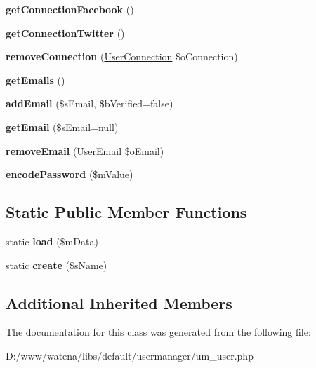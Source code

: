 \begin{DoxyCompactItemize}
\item 
\hypertarget{class_user_a69af1e21e331f954f22c511e8bf58b96}{{\bfseries get\-Connection\-Facebook} ()}\label{class_user_a69af1e21e331f954f22c511e8bf58b96}

\item 
\hypertarget{class_user_a19b24a9d7dccaf05646cb0f79a9ee52c}{{\bfseries get\-Connection\-Twitter} ()}\label{class_user_a19b24a9d7dccaf05646cb0f79a9ee52c}

\item 
\hypertarget{class_user_aa71e3aca612e5a6718f7ced1a44aa04c}{{\bfseries remove\-Connection} (\hyperlink{class_user_connection}{User\-Connection} \$o\-Connection)}\label{class_user_aa71e3aca612e5a6718f7ced1a44aa04c}

\item 
\hypertarget{class_user_a3c086413260d34ff4b247aa43312f87f}{{\bfseries get\-Emails} ()}\label{class_user_a3c086413260d34ff4b247aa43312f87f}

\item 
\hypertarget{class_user_a9e5819ec9b86a72ef09df68bf44aa5da}{{\bfseries add\-Email} (\$s\-Email, \$b\-Verified=false)}\label{class_user_a9e5819ec9b86a72ef09df68bf44aa5da}

\item 
\hypertarget{class_user_a906c866d515ade7d2872084192acabeb}{{\bfseries get\-Email} (\$s\-Email=null)}\label{class_user_a906c866d515ade7d2872084192acabeb}

\item 
\hypertarget{class_user_ae173c13825d8a41ec073485bce7316ed}{{\bfseries remove\-Email} (\hyperlink{class_user_email}{User\-Email} \$o\-Email)}\label{class_user_ae173c13825d8a41ec073485bce7316ed}

\item 
\hypertarget{class_user_a65978063da01806f89e29ed3ea8702bc}{{\bfseries encode\-Password} (\$m\-Value)}\label{class_user_a65978063da01806f89e29ed3ea8702bc}

\end{DoxyCompactItemize}
\subsection*{Static Public Member Functions}
\begin{DoxyCompactItemize}
\item 
\hypertarget{class_user_a03d0f98a0b877caccba9fe5a3535d06e}{static {\bfseries load} (\$m\-Data)}\label{class_user_a03d0f98a0b877caccba9fe5a3535d06e}

\item 
\hypertarget{class_user_af1c0e29a0bdb377ef718a174fba990f6}{static {\bfseries create} (\$s\-Name)}\label{class_user_af1c0e29a0bdb377ef718a174fba990f6}

\end{DoxyCompactItemize}
\subsection*{Additional Inherited Members}


The documentation for this class was generated from the following file\-:\begin{DoxyCompactItemize}
\item 
D\-:/www/watena/libs/default/usermanager/um\-\_\-user.\-php\end{DoxyCompactItemize}
